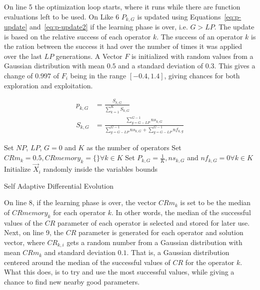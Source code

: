On line 5 the optimization loop starts, where it runs while there are
function evaluations left to be used. On Like 6 $P_{k,G}$ is updated using
Equations~\eqref{eq:p-update} and~\eqref{eq:p-update2}
if the learning phase is over, i.e. $G > LP$.
The update is based on the relative success of each operator $k$. The success
of an operator $k$ is the ration between the success it had over the number of
times it was applied over the last $LP$ generations. A Vector $F$ is initialized
with random values from a Gaussian distribution with mean $0.5$ and a standard
deviation of $0.3$. This gives a change of $0.997$ of $F_i$ being in the range
$[-0.4, 1.4]$, giving chances for both exploration and exploitation.

\begin{align} \label{eq:p-update}
    p_{k,G} &= \frac{S_{k,G}}{\sum^{K}_{k=1}S_{k,G}} \\
    \label{eq:p-update2}
    S_{k,G} &= \frac{\sum^{G-1}_{g=G-LP}ns_{k,G}}{\sum^{G-1}_{g=G-LP}ns_{k,G} + \sum^{G-1}_{g=G-LP}nf_{k,g}}
\end{align}

\begin{algorithm}[ht]
\SetAlgoLined
Set $NP$, $LP$, $G=0$ and $K$ as the number of operators\;
Set $CRm_k = 0.5, CRmemory_k = \{\} \forall k \in K$\;
Set $P_{k,G} = \frac{1}{K}, ns_{k,G}$ and $nf_{k, G} = 0 \forall k \in K$\;
Initialize $\Vec{X}_i$ randomly inside the variables bounds\;
    \caption{Self Adaptive Differential Evolution}
    \label{algo:sade}
\end{algorithm}

On line 8, if the learning phase is over, the vector $CRm_k$ is set to be
the median of $CRmemory_k$ for each operator $k$. In other words, the median of
the successful values of the $CR$ parameter of each operator is selected and stored
for later use. Next, on line 9, the $CR$ parameter is generated for each
operator and solution vector, where $CR_{k,i}$ gets a random number from
a Gaussian distribution with mean $CRm_k$ and standard deviation $0.1$.
That is, a Gaussian distribution centered around the median of the successful
values of $CR$ for the operator $k$. What this does, is to try and use the
most successful values, while giving a chance to find new nearby
good parameters.

